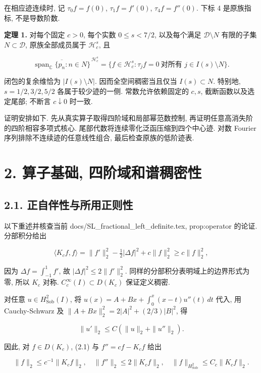 \documentclass[UTF8,fontset=fandol,11pt,a4paper]{ctexart}
\begin{document}
在相应迹连续时, 记 \(\tau_0 f=f(0)\), \(\tau_1 f=f'(0)\), \(\tau_4 f=f''(0)\). 下标 4 是原族指标, 不是导数阶数.


\textbf{定理 1.} 对每个固定 \(c>0\), 每个实数 \(0\le s<7/2\), 以及每个满足 \(\mathcal D\setminus N\) 有限的子集 \(N\subset\mathcal D\), 原族全部成员属于 \(\mathcal H_c^s\), 且


\[
 \boxed{
 \overline{\operatorname{span}_{\mathbb C}\{p_n:n\in N\}}^{\,\mathcal H_c^s}
 =
 \{f\in\mathcal H_c^s:\tau_j f=0\ \text{对所有 }j\in I(s)\setminus N\}.
 }
 \tag{1.5}
\]


闭包的复余维恰为 \(|I(s)\setminus N|\). 因而全空间稠密当且仅当 \(I(s)\subset N\). 特别地, \(s=1/2,3/2,5/2\) 各属于较少迹的一侧. 常数允许依赖固定的 \(c,s\), 截断函数以及选定尾部; 不断言 \(c\downarrow0\) 时一致.


证明安排如下. 先从真实算子取得四阶域和局部幂范数控制, 再证明任意高消失阶的四阶相容多项式核心. 尾部代数将连续零化泛函压缩到四个中心迹. 对数 Fourier 序列排除不连续迹的任意线性组合, 最后检查原族的低阶迹表.


\section*{2. 算子基础, 四阶域和谱稠密性}

\subsection*{2.1. 正自伴性与所用正则性}

以下重述并核查当前 docs/SL\_fractional\_left\_definite.tex, prop:operator 的论证. 分部积分给出


\[
 \langle K_cf,f\rangle
 =\|f'\|_2^2-\tfrac12|\Delta f|^2+c\|f\|_2^2
 \ge c\|f\|_2^2,
 \tag{2.1}
\]


因为 \(\Delta f=\int_{-1}^1 f'\), 故 \(|\Delta f|^2\le2\|f'\|_2^2\). 同样的分部积分表明域上的边界形式为零, 所以 \(K_c\) 对称. \(C_c^\infty(I)\subset D(K_c)\) 保证定义稠密.


对任意 \(u\in H_{\mathrm{Sob}}^2(I)\), 将
\(u(x)=A+Bx+\int_0^x(x-t)u''(t)\,dt\)
代入, 用 Cauchy-Schwarz 及
\(\|A+Bx\|_2^2=2|A|^2+(2/3)|B|^2\), 得


\[
 \|u'\|_2\le C(\|u\|_2+\|u''\|_2).
 \tag{2.2}
\]


因此, 对 \(f\in D(K_c)\), (2.1) 与 \(f''=cf-K_cf\) 给出


\[
 \|f\|_2\le c^{-1}\|K_cf\|_2,\quad
 \|f''\|_2\le2\|K_cf\|_2,\quad
 \|f\|_{H_{\mathrm{Sob}}^2}\le C_c\|K_cf\|_2.
 \tag{2.3}
\]
\end{document}
